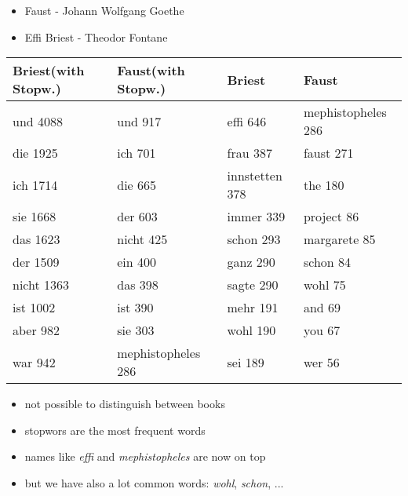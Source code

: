 \begin{frame}[c]
	\begin{itemize}
		\begin{itemize}
			\item Faust - Johann Wolfgang Goethe
			\item Effi Briest - Theodor Fontane
		\end{itemize}
	\end{itemize}

	\begin{small}
	\begin{tabular}{|l|l|l|l|}
		\hline \textbf{Briest(with Stopw.)} & \textbf{Faust(with Stopw.)} & \textbf{Briest} & \textbf{Faust} \\ 
		\hline und 4088 & und 917 & effi 646 & mephistopheles	286  \\ 
		\hline die 1925 & ich 701 & frau 387 & faust 271 \\ 
		\hline ich 1714 & die 665 & innstetten 378 & the 180 \\ 
		\hline sie 1668 & der 603 & immer 339 & project 86 \\ 
		\hline das 1623 & nicht 425 & schon 293 & margarete	85 \\ 
		\hline der 1509 & ein 400 	& ganz 290 & schon 84 \\ 
		\hline nicht 1363 & das 398	& sagte 290 & wohl 75 \\ 
		\hline ist 1002 & ist 390 & mehr 191 & and 69 \\ 
		\hline aber 982 & sie 303 & wohl 190 & you 67 \\ 
		\hline war 942 	& mephistopheles 286 & sei 189 & wer 56 \\
		\hline 
	\end{tabular} 
	\end{small}
\end{frame}

\begin{frame}[t]
	\begin{itemize}
		\begin{itemize}
			\item not possible to distinguish between books
			\item stopwors are the most frequent words
		\end{itemize}
		\begin{itemize}
			\item names like \textit{effi} and \textit{mephistopheles} are now on top
			\item but we have also a lot common words: \textit{wohl}, \textit{schon}, ...
		\end{itemize}
	\end{itemize}
\end{frame}